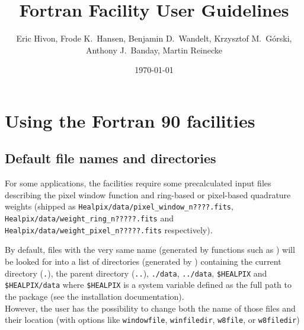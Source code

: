 \documentclass[12pt,twoside]{article}
\begin{document}
\title{\healpix Fortran Facility User Guidelines}
\label{fac:facilities}
\author{Eric Hivon, Frode K.~Hansen, Benjamin D.~Wandelt, Krzysztof M.~G\'orski,
Anthony J.~Banday, Martin Reinecke}
%
\date{\today}

\frontpage
\tableofcontents
\newpage

\section{Using the \healpix Fortran 90 facilities}
\subsection{Default file names and directories}
\label{fac:subsec:defdir}
For some applications, the \healpix facilities
require some precalculated input files describing the pixel window
function and ring-based or pixel-based quadrature weights (shipped as 
{\tt Healpix/data/pixel\_\-window\_\-n????.fits},
{\tt Healpix/data/weight\_\-ring\_\-n?????.fits} and
{\tt Healpix/data/weight\_\-pixel\_\-n?????.fits} respectively). \label{page:defdir}

By default, files with the very same name (generated by functions such as 
) 
will be looked for into a list of directories (generated by 
) 
containing the current directory (\texttt{.}), the parent directory (\texttt{..}),
\texttt{./data}, \texttt{../data}, \texttt{\$HEALPIX} and \texttt{\$HEALPIX/data} where \texttt{\$HEALPIX} is
a system variable defined as the full path to the \healpix package
(see the installation documentation).\\
However, the user has the possibility to change both the name of those files
and their location (with options like 
\texttt{windowfile},
\texttt{winfiledir},
\texttt{w8file}, or
\texttt{w8filedir})
\end{document}
